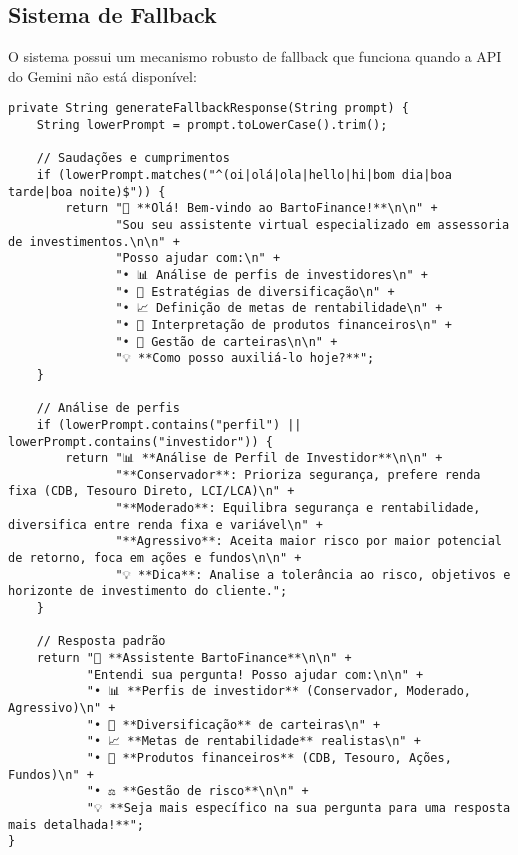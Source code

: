 \documentclass[12pt,a4paper]{article}
\begin{document}
\subsection{Sistema de Fallback}

O sistema possui um mecanismo robusto de fallback que funciona quando a API do Gemini não está disponível:

\begin{lstlisting}[caption=Sistema de Fallback]
private String generateFallbackResponse(String prompt) {
    String lowerPrompt = prompt.toLowerCase().trim();
    
    // Saudações e cumprimentos
    if (lowerPrompt.matches("^(oi|olá|ola|hello|hi|bom dia|boa tarde|boa noite)$")) {
        return "👋 **Olá! Bem-vindo ao BartoFinance!**\n\n" +
               "Sou seu assistente virtual especializado em assessoria de investimentos.\n\n" +
               "Posso ajudar com:\n" +
               "• 📊 Análise de perfis de investidores\n" +
               "• 🎯 Estratégias de diversificação\n" +
               "• 📈 Definição de metas de rentabilidade\n" +
               "• 🏦 Interpretação de produtos financeiros\n" +
               "• 💼 Gestão de carteiras\n\n" +
               "💡 **Como posso auxiliá-lo hoje?**";
    }
    
    // Análise de perfis
    if (lowerPrompt.contains("perfil") || lowerPrompt.contains("investidor")) {
        return "📊 **Análise de Perfil de Investidor**\n\n" +
               "**Conservador**: Prioriza segurança, prefere renda fixa (CDB, Tesouro Direto, LCI/LCA)\n" +
               "**Moderado**: Equilibra segurança e rentabilidade, diversifica entre renda fixa e variável\n" +
               "**Agressivo**: Aceita maior risco por maior potencial de retorno, foca em ações e fundos\n\n" +
               "💡 **Dica**: Analise a tolerância ao risco, objetivos e horizonte de investimento do cliente.";
    }
    
    // Resposta padrão
    return "🤖 **Assistente BartoFinance**\n\n" +
           "Entendi sua pergunta! Posso ajudar com:\n\n" +
           "• 📊 **Perfis de investidor** (Conservador, Moderado, Agressivo)\n" +
           "• 🎯 **Diversificação** de carteiras\n" +
           "• 📈 **Metas de rentabilidade** realistas\n" +
           "• 🏦 **Produtos financeiros** (CDB, Tesouro, Ações, Fundos)\n" +
           "• ⚖️ **Gestão de risco**\n\n" +
           "💡 **Seja mais específico na sua pergunta para uma resposta mais detalhada!**";
}
\end{lstlisting}
\end{document}
